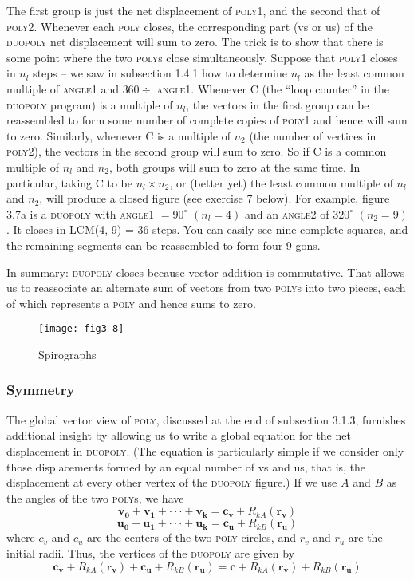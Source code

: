 \documentclass{book}
\begin{document}
The first group is just the net displacement of \textsc{poly1}, and the second
that of \textsc{poly2}. Whenever each \textsc{poly} closes, the corresponding part (vs
or us) of the \textsc{duopoly} net displacement will sum to zero. The trick is to
show that there is some point where the two \textsc{poly}s close simultaneously.
Suppose that \textsc{poly1} closes in $n_l$ steps -- we saw in subsection 1.4.1
how to determine $n_l$ as the least common multiple of \textsc{angle1} and $360 \div$
\textsc{angle1}. Whenever C (the ``loop counter'' in the \textsc{duopoly} program) is
a multiple of $n_l$, the vectors in the first group can be reassembled to
form some number of complete copies of \textsc{poly1} and hence will sum to
zero. Similarly, whenever C is a multiple of $n_2$ (the number of vertices
in \textsc{poly2}), the vectors in the second group will sum to zero. So if C is
a common multiple of $n_l$ and $n_2$, both groups will sum to zero at the
same time. In particular, taking C to be $n_l \times n_2$, or (better yet) the least
common multiple of $n_l$ and $n_2$, will produce a closed figure (see exercise
7 below). For example, figure 3.7a is a \textsc{duopoly} with \textsc{angle1} $= 90^{\circ}$
$(n_l = 4)$ and an \textsc{angle2} of $320^{\circ}$ $(n_2 = 9)$. It closes in LCM(4, 9) =
36 steps. You can easily see nine complete squares, and the remaining
segments can be reassembled to form four 9-gons.

In summary: \textsc{duopoly} closes because vector addition is commutative.
That allows us to reassociate an alternate sum of vectors from two \textsc{poly}s
into two pieces, each of which represents a \textsc{poly} and hence sums to zero.

\begin{figure}
\begin{center}
\texttt{[image: fig3-8]}
\caption{Spirographs}
\end{center}
\end{figure}

\subsubsection{Symmetry}
The global vector view of \textsc{poly}, discussed at the end of subsection 3.1.3,
furnishes additional insight by allowing us to write a global equation for
the net displacement in \textsc{duopoly}. (The equation is particularly simple if
we consider only those displacements formed by an equal number of vs
and us, that is, the displacement at every other vertex of the \textsc{duopoly}
figure.) If we use $A$ and $B$ as the angles of the two \textsc{poly}s, we have
$$\mathbf{v_0}+\mathbf{v_1}+\cdot \cdot \cdot +\mathbf{v_k} = \mathbf{c_v}+R_{kA}(\mathbf{r_v})$$
$$\mathbf{u_0}+\mathbf{u_1}+\cdot \cdot \cdot +\mathbf{u_k} = \mathbf{c_u}+R_{kB}(\mathbf{r_u})$$
\noindent where \textbf{$c_v$} and \textbf{$c_u$} are the centers of the two \textsc{poly} circles, and \textbf{$r_v$} and \textbf{$r_u$} are the initial radii. Thus, the vertices of the \textsc{duopoly} are given by
$$\mathbf{c_v} + R_{kA}(\mathbf{r_v}) + \mathbf{c_u} + R_{kB}(\mathbf{r_u}) = \mathbf{c} + R_{kA}(\mathbf{r_v}) + R_{kB}(\mathbf{r_u})$$
\end{document}
